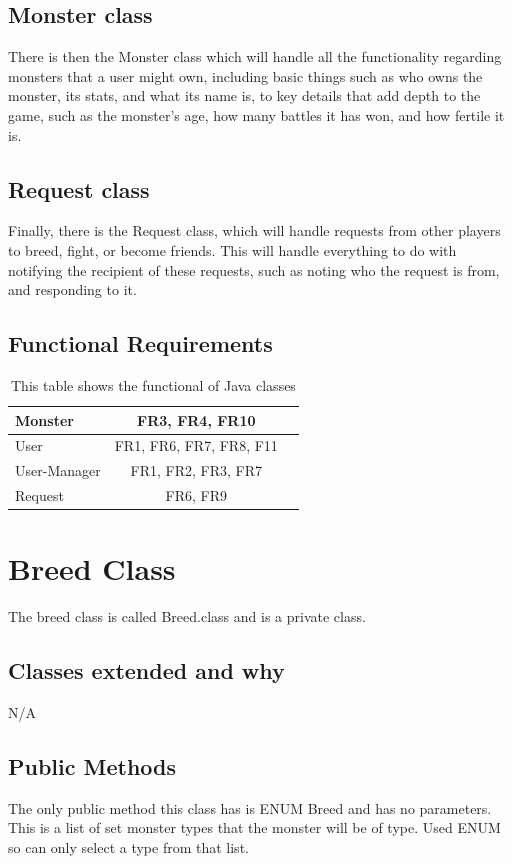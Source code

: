 \documentclass{project}
\begin{document}
\subsection{Monster class}
There is then the Monster class which will handle all the functionality regarding monsters that a user might own, including basic things such as who owns the monster, its stats, and what its name is, to key details that add depth to the game, such as the monster’s age, how many battles it has won, and how fertile it is.
\subsection{Request class}
Finally, there is the Request class, which will handle requests from other players to breed, fight, or become friends. This will handle everything to do with notifying the recipient of these requests, such as noting who the request is from, and responding to it.

\subsection{Functional Requirements}
\begin{table}[!h]
\centering
\begin{tabular}{|l|c|r}
\hline
Monster & FR3, FR4, FR10 \\ \hline
User & FR1, FR6, FR7, FR8, F11 \\ \hline
User-Manager & FR1, FR2, FR3, FR7 \\ \hline
Request & FR6, FR9 \\ \hline
\end{tabular}
\caption{This table shows the functional of Java classes}
\label{tab:myfirsttable}
\end{table} 

\section{Breed Class}
The breed class is called Breed.class and is a private class.
\subsection{Classes extended and why}
N/A
\subsection{Public Methods} 
The only public method this class has is ENUM Breed and has no parameters. This is a list of set monster types that the monster will be of type. Used ENUM so can only select a type from that list.
\end{document}
